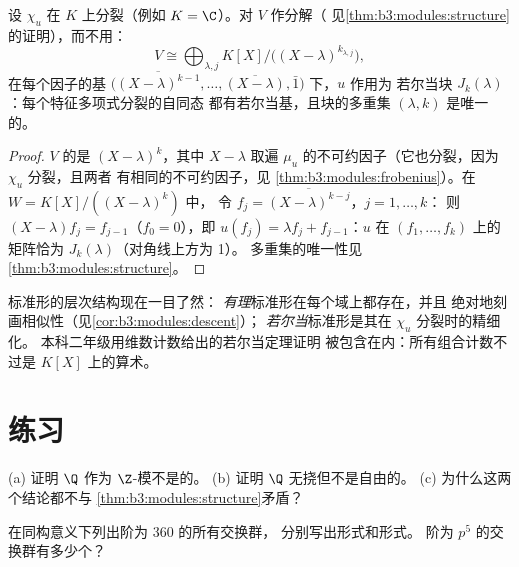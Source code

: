 \begin{theorem}\label{thm:b3:modules:jordan}
设 $\chi_u$ 在 $K$ 上分裂（例如 $K = \C$）。对
$V$ 作分解（
见\cref{thm:b3:modules:structure}的证明），而不用：
\[
V \cong \bigoplus_{\lambda, j} K[X]\big/\bigl((X -
\lambda)^{k_{\lambda,j}}\bigr),
\]
在每个因子的基 $\bigl(\overline{(X-\lambda)^{k-1}}, \dots,
\overline{(X - \lambda)}, \bar 1\bigr)$ 下，$u$ 作用为
若尔当块 $J_k(\lambda)$：每个特征多项式分裂的自同态
都有若尔当基，且块的多重集
$(\lambda, k)$ 是唯一的。
\end{theorem}

\begin{proof}
 $V$ 的是
$(X - \lambda)^k$，其中 $X - \lambda$ 取遍
$\mu_u$ 的不可约因子（它也分裂，因为 $\chi_u$ 分裂，且两者
有相同的不可约因子，见
\cref{thm:b3:modules:frobenius}）。在 $W = K[X]/((X-\lambda)^k)$ 中，
令 $f_j = \overline{(X - \lambda)^{k-j}}$，$j = 1, \dots, k$：
则 $(X - \lambda)f_j = f_{j-1}$（$f_0 = 0$），即 $u(f_j)
= \lambda f_j + f_{j-1}$：$u$ 在 $(f_1, \dots,
f_k)$ 上的矩阵恰为 $J_k(\lambda)$（对角线上方为 1）。
多重集的唯一性见
\cref{thm:b3:modules:structure}。
\end{proof}

\begin{remark}\label{rem:b3:modules:overview}
标准形的层次结构现在一目了然：
\emph{有理}标准形在每个域上都存在，并且
绝对地刻画相似性（见\cref{cor:b3:modules:descent}）；
\emph{若尔当}标准形是其在 $\chi_u$ 分裂时的精细化。
本科二年级用维数计数给出的若尔当定理证明
被包含在内：所有组合计数不过是
$K[X]$ 上的算术。
\end{remark}

\section{练习}

\begin{exercise}[$\star$]\label{exo:b3:modules:1}
(a) 证明 $\Q$ 作为 $\Z$-模不是的。
(b) 证明 $\Q$ 无挠但不是自由的。
(c) 为什么这两个结论都不与
\cref{thm:b3:modules:structure}矛盾？
\end{exercise}

\begin{exercise}[$\star$]\label{exo:b3:modules:2}
在同构意义下列出阶为 $360$ 的所有交换群，
分别写出形式和形式。
阶为 $p^5$ 的交换群有多少个？
\end{exercise}

